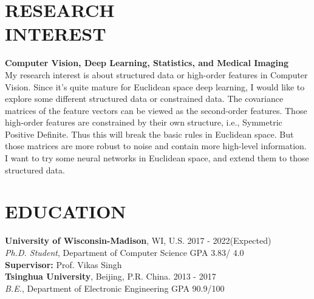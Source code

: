 \documentclass[margin]{res}
\begin{document}
\begin{resume}
\vspace{-2em}
\section{RESEARCH \\ INTEREST}
                \textbf{Computer Vision, Deep Learning, Statistics, and Medical Imaging}\\
                My research interest is about structured data or high-order features in Computer Vision. Since it's quite mature for Euclidean space deep learning, I would like to explore some different structured data or constrained data. The covariance matrices of the feature vectors can be viewed as the second-order features. Those high-order features are constrained by their own structure, i.e., Symmetric Positive Definite. Thus this will break the basic rules in Euclidean space. But those matrices are more robust to noise and contain more high-level information. I want to try some neural networks in Euclidean space, and extend them to those structured data.
                
\vspace{-1em}
\section{EDUCATION} 
                {\bf University of Wisconsin-Madison}, WI, U.S. \hfill 2017 - 2022(Expected)\\
                {\sl {Ph.D. Student}}, Department of Computer Science \hfill GPA 3.83/ 4.0\\
                {\bf Supervisor:} Prof. Vikas Singh\\
                {\bf Tsinghua University}, Beijing, P.R. China. \hfill 2013 - 2017\\
                {\sl {B.E.}}, Department of Electronic Engineering \hfill GPA 90.9/100

\vspace{-1em}                

\end{resume}
\end{document}
